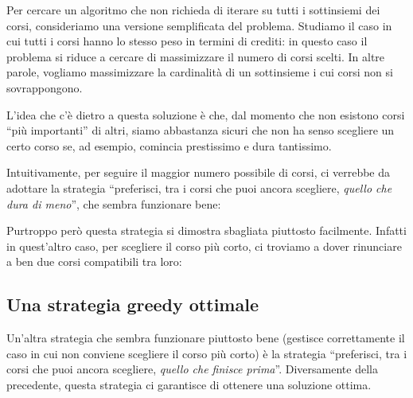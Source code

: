 \VeloceUnweighted
Per cercare un algoritmo che non richieda di iterare su tutti i sottinsiemi dei corsi, consideriamo una versione semplificata del problema. Studiamo il caso in cui tutti i corsi hanno lo stesso peso in termini di crediti: in questo caso il problema si riduce a cercare di massimizzare il numero di corsi scelti. In altre parole, vogliamo massimizzare la cardinalità di un sottinsieme i cui corsi non si sovrappongono.

L'idea che c'è dietro a questa soluzione è che, dal momento che non esistono corsi ``più importanti'' di altri, siamo abbastanza sicuri che non ha senso scegliere un certo corso se, ad esempio, comincia prestissimo e dura tantissimo.

\begin{center}
\end{center}

Intuitivamente, per seguire il maggior numero possibile di corsi, ci verrebbe da adottare la strategia ``preferisci, tra i corsi che puoi ancora scegliere, \textit{quello che dura di meno}'', che sembra funzionare bene:

\begin{center}
\end{center}

Purtroppo però questa strategia si dimostra sbagliata piuttosto facilmente. Infatti in quest'altro caso, per scegliere il corso più corto, ci troviamo a dover rinunciare a ben due corsi compatibili tra loro:

\begin{center}
\end{center}

\subsection*{Una strategia greedy ottimale}
Un'altra strategia che sembra funzionare piuttosto bene (gestisce correttamente il caso in cui non conviene scegliere il corso più corto) è la strategia ``preferisci, tra i corsi che puoi ancora scegliere, \textit{quello che finisce prima}''. Diversamente della precedente, questa strategia ci garantisce di ottenere una soluzione ottima.

